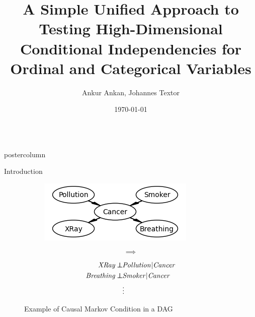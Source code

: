 \documentclass{beamer}
\title{\huge A Simple Unified Approach to Testing High-Dimensional Conditional Independencies for Ordinal and Categorical Variables}
\author{Ankur Ankan, Johannes Textor}
\institute[RU]{Institute for Computing and Information Sciences \\ Radboud University, Netherlands}
\date{\today}
\def\ci{\perp\!\!\!\!\!\perp}
\newlength{\columnheight}
\begin{document}
\begin{frame}
\begin{columns}
	\begin{column}{.33\textwidth}
		\begin{beamercolorbox}[center]{postercolumn}
			\begin{minipage}{.98\textwidth}  %
				\parbox[t][\columnheight]{\textwidth}{ %
					\begin{myblock}{Introduction}
						\begin{figure}
							\begin{subfigure}{0.46\textwidth}
								\centering
								\includegraphics[scale=1.5]{../in_person/imgs/example_dag.png}
							\end{subfigure}%
							\begin{subfigure}{0.08\textwidth}
								$$ \bm{\implies} $$
							\end{subfigure}%
							\begin{subfigure}{0.46\textwidth}
								\begin{equation*}
									\begin{split}
										\text{\emph{XRay}} \ci & \text{\emph{Pollution}} | \text{\emph{Cancer}} \\
										\text{\emph{Breathing}} \ci & \text{\emph{Smoker}} | \text{\emph{Cancer}} \\
										& \vdots \\
									\end{split}
								\end{equation*}
							\end{subfigure}
							\caption*{Example of Causal Markov Condition in a DAG \footnotemark}
						\end{figure}


\end{myblock}}
\end{minipage}
\end{beamercolorbox}
\end{column}
\end{columns}
\end{frame}
\end{document}
